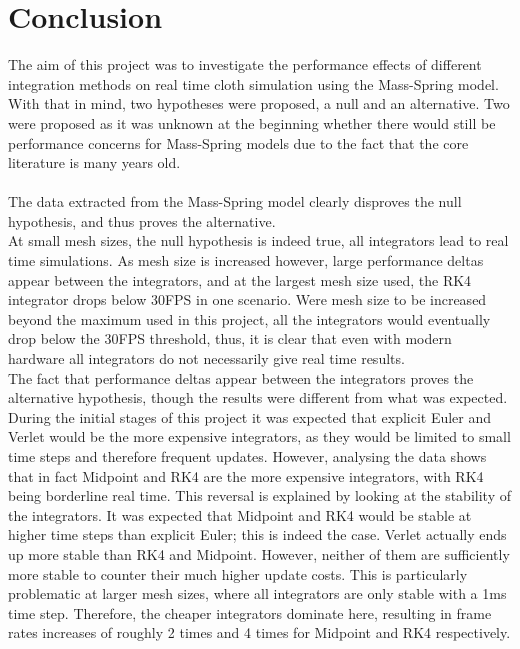 \chapter{Conclusion}

The aim of this project was to investigate the performance effects of different integration methods on real time cloth simulation using the Mass-Spring model. With that in mind, two hypotheses were proposed, a null and an alternative. Two were proposed as it was unknown at the beginning whether there would still be performance concerns for Mass-Spring models due to the fact that the core literature is many years old.
\\\\The data extracted from the Mass-Spring model clearly disproves the null hypothesis, and thus proves the alternative.
\\At small mesh sizes, the null hypothesis is indeed true, all integrators lead to real time simulations. As mesh size is increased however, large performance deltas appear between the integrators, and at the largest mesh size used, the RK4 integrator drops below 30FPS in one scenario. Were mesh size to be increased beyond the maximum used in this project, all the integrators would eventually drop below the 30FPS threshold, thus, it is clear that even with modern hardware all integrators do not necessarily give real time results. 
\\The fact that performance deltas appear between the integrators proves the alternative hypothesis, though the results were different from what was expected. During the initial stages of this project it was expected that explicit Euler and Verlet would be the more expensive integrators, as they would be limited to small time steps and therefore frequent updates. However, analysing the data shows that in fact Midpoint and RK4 are the more expensive integrators, with RK4 being borderline real time. This reversal is explained by looking at the stability of the integrators. It was expected that Midpoint and RK4 would be stable at higher time steps than explicit Euler; this is indeed the case. Verlet actually ends up more stable than RK4 and Midpoint. However, neither of them are sufficiently more stable to counter their much higher update costs. This is particularly problematic at larger mesh sizes, where all integrators are only stable with a 1ms time step. Therefore, the cheaper integrators dominate here, resulting in frame rates increases of roughly 2 times and 4 times for Midpoint and RK4 respectively.
